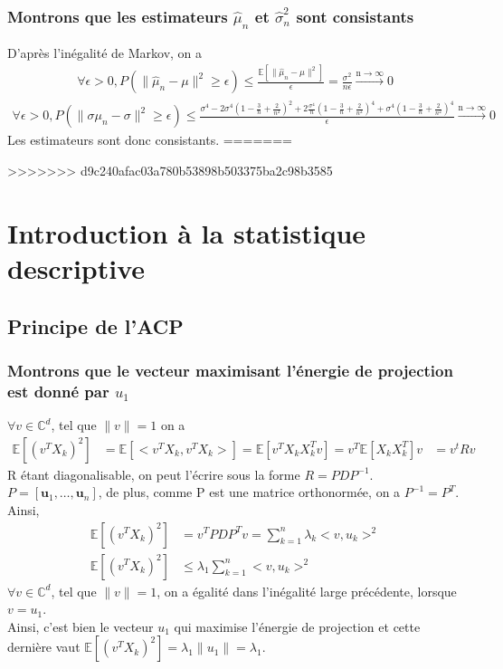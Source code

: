\documentclass{report}
\begin{document}
		\subsection{Montrons que les estimateurs $\hat\mu_n$ et $\hat\sigma^2_n$ sont consistants}
			D'après l'inégalité de Markov, on a
			\begin{align*}
				\forall \epsilon>0, P(\lVert \hat\mu_n - \mu \rVert^2 \geq \epsilon) \leq \frac{\mathbb{E}[\lVert \hat\mu_n - \mu \rVert^2]}{\epsilon} = \frac{\sigma^2}{n\epsilon} \xrightarrow{\text{n}\xrightarrow{} \infty} 0
			\end{align*}
			\begin{align*}
				\forall \epsilon>0, P(\lVert \sigma\mu_n - \sigma\rVert^2 \geq \epsilon) \leq \frac{\sigma^4 - 2\sigma^4(1-\frac{3}{n}+\frac{2}{n^2})^2 + 2\frac{\sigma^4}{n}(1-\frac{3}{n}+\frac{2}{n^2})^4 + \sigma^4(1-\frac{3}{n}+\frac{2}{n^2})^4}{\epsilon} \xrightarrow{\text{n}\xrightarrow{} \infty} 0
			\end{align*}
			Les estimateurs sont donc consistants.
=======

>>>>>>> d9c240afac03a780b53898b503375ba2c98b3585
\chapter{Introduction à la statistique descriptive}
	\section{Principe de l'ACP}
		\subsection{Montrons que le vecteur maximisant l'énergie de projection est donné par $u_1$}
			$\forall v \in \mathbb{C}^d$, tel que $\lVert v \rVert = 1$ on a
			\begin{align*}
				\mathbb{E}[(v^TX_k)^2] &= \mathbb{E}[<v^TX_k, v^TX_k>] = \mathbb{E}[v^TX_kX_k^Tv] = v^T\mathbb{E}[X_kX_k^T]v
				&= v^tRv 
			\end{align*}
			R étant diagonalisable, on peut l'écrire sous la forme $R=PDP^{-1}$.\\
			$P = [\textbf{u}_1, \ldots, \textbf{u}_n]$, de plus, comme P est une matrice orthonormée, on a $P^{-1} = P^T$.\\
			Ainsi, 
			\begin{align*}
				\mathbb{E}[(v^TX_k)^2] &= v^TPDP^Tv = \sum\limits_{k=1}^n \lambda_k<v, u_k>^2\\
				\mathbb{E}[(v^TX_k)^2] &\leq \lambda_1\sum\limits_{k=1}^n <v, u_k>^2
			\end{align*}
			$\forall v \in \mathbb{C}^d$, tel que $\lVert v \rVert = 1$, on a égalité dans l'inégalité large précédente, lorsque $v=u_1$. \\
			Ainsi, c'est bien le vecteur $u_1$ qui maximise l'énergie de projection et cette dernière vaut $\mathbb{E}[(v^TX_k)^2] = \lambda_1 \lVert u_1 \rVert = \lambda_1$.
\end{document}
